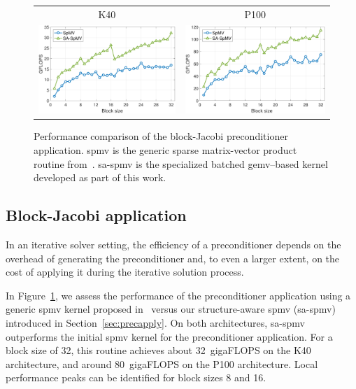 \begin{figure}
\begin{center}
\begin{tabular}{cc}
K40 & P100\\
\includegraphics[width=.46\columnwidth]{plots/bjp_apply_bs_d_K40.pdf}
&
\includegraphics[width=.46\columnwidth]{plots/bjp_apply_bs_d_P100.pdf}
\end{tabular}
\end{center}
\caption{
Performance comparison of the block-Jacobi preconditioner application.
{\sc spmv} is the generic sparse matrix-vector product routine
from~\cite{Anzt:2017:BGE:3026937.3026940}.
{\sc sa-spmv} is the specialized batched {\sc gemv}--based kernel developed as part of this work.  
}
\label{fig:precappl}
\end{figure}


\subsection{Block-Jacobi application}


In an iterative solver setting, the efficiency of a preconditioner depends on
the overhead of generating the preconditioner and, to even a larger extent, on
the cost of applying it during the iterative solution process.

In Figure~\ref{fig:precappl}, we assess the performance of the preconditioner
application using a generic {\sc spmv} kernel proposed
in~\cite{Anzt:2017:BGE:3026937.3026940} versus our structure-aware {\sc spmv}
({\sc sa-spmv}) introduced in Section~\ref{sec:precapply}. On both architectures,
{\sc sa-spmv} outperforms the initial {\sc spmv} kernel for the preconditioner
application. For a block size of 32, this routine achieves about 32~gigaFLOPS on the K40
architecture, and around 80~gigaFLOPS on the P100 architecture. Local performance peaks
can be identified for block sizes 8 and 16.

